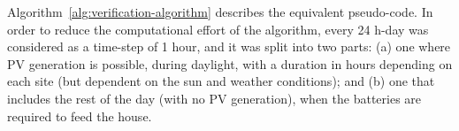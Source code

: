 %
%
%
% 
%
%
%

Algorithm~\ref{alg:verification-algorithm} describes the equivalent pseudo-code. %
In order to reduce the computational effort of the algorithm,
every 24 h-day was considered as a time-step of 1 hour, and it was split into two parts: (a) one where PV generation is possible, during daylight, with a duration in hours depending on each site (but dependent on the sun and weather conditions); and (b) one that includes the rest of the day (with no PV generation), when the batteries are required to feed the house.

